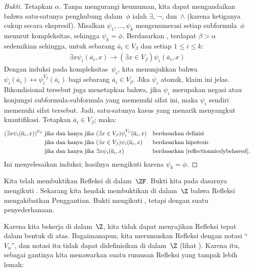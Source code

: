 \documentclass[../../../include/open-logic-section]{subfiles}
\begin{document}
\begin{proof}[Bukti]
Tetapkan $\alpha$. Tanpa mengurangi keumuman, kita dapat mengandaikan bahwa
satu-satunya penghubung dalam~$\phi$ ialah $\exists$, $\lnot$, dan~$\land$
(karena ketiganya cukup secara ekspresif). Misalkan
$\psi_1,\ldots,\psi_k$ mengenumerasi setiap subformula~$\phi$ menurut
kompleksitas, sehingga $\psi_k=\phi$. Berdasarkan ,
terdapat $\beta>\alpha$ sedemikian sehingga, untuk sebarang
$\overline{a}_i\in V_\beta$ dan setiap $1\leq i\leq k$:
\begin{align}\label{reflectionnicelybehaved}
	\exists x\psi_i(\overline{a}_i, x) \rightarrow 
	(\exists x \in V_\beta) \psi_i(\overline{a}_i, x)\tag{*}
\end{align}
Dengan induksi pada kompleksitas~$\psi_i$, kita menunjukkan bahwa
$\psi_i(\overline{a}_i)\leftrightarrow
\psi_i^{V_\beta}(\overline{a}_i)$ bagi sebarang
$\overline{a}_i\in V_\beta$. Jika $\psi_i$ atomik, klaim ini jelas.
Bikondisional tersebut juga menetapkan bahwa, jika $\psi_i$ merupakan negasi
atau konjungsi subformula-subformula yang memenuhi sifat ini, maka $\psi_i$
sendiri memenuhi sifat tersebut. Jadi, satu-satunya kasus yang menarik
menyangkut kuantifikasi. Tetapkan $\overline{a}_i\in V_\beta$; maka:
\begin{align*}
	(\exists x \psi_i(\overline{a}_i, x))^{V_\beta}
	&\text{ jika dan hanya jika }
	(\exists x \in V_\beta)\psi_i^{V_\beta}(\overline{a}_i, x)
	&&\text{berdasarkan definisi}\\
	&\text{ jika dan hanya jika }
	(\exists x \in V_\beta)\psi_i(\overline{a}_i, x)
	&&\text{berdasarkan hipotesis}\\
	&\text{ jika dan hanya jika }
	\exists x \psi_i(\overline{a}_i, x)
	&&\text{berdasarkan \eqref{reflectionnicelybehaved}.}
\end{align*}
Ini menyelesaikan induksi; hasilnya mengikuti karena $\psi_k=\phi$.
\end{proof}

Kita telah membuktikan Refleksi di dalam~$\ZF$. Bukti kita pada dasarnya
mengikuti \citet{Montague1961}. Sekarang kita hendak membuktikan di
dalam~$\Z$ bahwa Refleksi mengakibatkan Penggantian. Bukti mengikuti
\citet{Levy1960}, tetapi dengan suatu penyederhanaan.

Karena kita bekerja di dalam~$\Z$, kita tidak dapat menyajikan Refleksi tepat
dalam bentuk di atas. Bagaimanapun, kita merumuskan Refleksi dengan notasi
``$V_\alpha$'', dan notasi itu tidak dapat didefinisikan di dalam~$\Z$
(lihat ). Karena itu, sebagai gantinya kita
menawarkan suatu rumusan Refleksi yang tampak lebih lemah:
\end{document}
